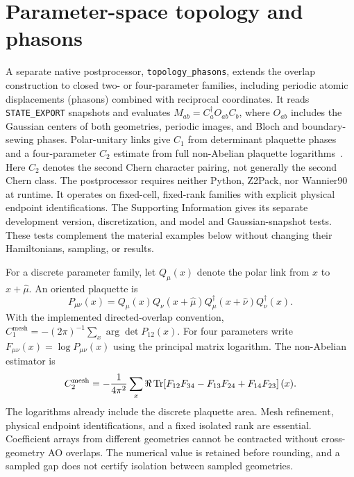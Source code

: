 \section{Parameter-space topology and phasons}
\label{sec:phasons}
A separate native postprocessor, \texttt{topology\_phasons}, extends the
overlap construction to closed two- or four-parameter families, including
periodic atomic displacements (phasons) combined with reciprocal
coordinates. It reads \texttt{STATE\_EXPORT} snapshots and evaluates
$M_{ab}=C_a^\dagger O_{ab}C_b$, where $O_{ab}$ includes the Gaussian
centers of both geometries, periodic images, and Bloch and boundary-sewing
phases. Polar-unitary links give $C_1$ from determinant plaquette
phases~\cite{Fukui2005} and a four-parameter $C_2$ estimate from full
non-Abelian plaquette logarithms~\cite{MocholGrzelak2019}. Here $C_2$
denotes the second Chern character pairing, not generally the second
Chern class. The postprocessor requires neither Python, Z2Pack, nor
Wannier90 at runtime. It operates on fixed-cell, fixed-rank families with
explicit physical endpoint identifications. The Supporting Information
gives its separate development version, discretization, and model and
Gaussian-snapshot tests. These tests complement the material examples
below without changing their Hamiltonians, sampling, or results.


For a discrete parameter family, let $Q_\mu(x)$ denote the polar link
from $x$ to $x+\hat\mu$. An oriented plaquette is
\begin{equation}
 P_{\mu\nu}(x)=Q_\mu(x)Q_\nu(x+\hat\mu)
 Q_\mu^\dagger(x+\hat\nu)Q_\nu^\dagger(x).
\end{equation}
With the implemented directed-overlap convention,
$C_1^{\mathrm{mesh}}=-(2\pi)^{-1}\sum_x\arg\det P_{12}(x)$.
For four parameters write $F_{\mu\nu}(x)=\log P_{\mu\nu}(x)$
using the principal matrix logarithm. The non-Abelian estimator is
\begin{equation}
 C_2^{\mathrm{mesh}}=-\frac{1}{4\pi^2}\sum_x
 \Re\operatorname{Tr}\!\left[F_{12}F_{34}-F_{13}F_{24}+F_{14}F_{23}\right](x).
 \label{eq:phason-c2}
\end{equation}
The logarithms already include the discrete plaquette area.
Mesh refinement, physical endpoint identifications, and a fixed isolated
rank are essential. Coefficient arrays from different geometries
cannot be contracted without cross-geometry AO overlaps.
The numerical value is retained before rounding, and a sampled gap
does not certify isolation between sampled geometries.
